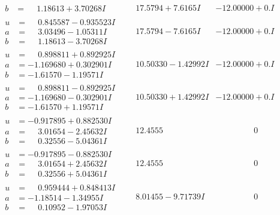 \documentclass[1p]{elsarticle_modified}
\theoremstyle{definition}
\begin{document}
$$\begin{array}{c|c|c}
\begin{aligned}
b &= \phantom{-}1.18613 + 3.70268 I\end{aligned}
 & \phantom{-}17.5794 + 7.6165 I & -12.00000 + 0. I\phantom{ +0.000000I} \\ \hline\begin{aligned}
u &= \phantom{-}0.845587 - 0.935523 I \\
a &= \phantom{-}3.03496 - 1.05311 I \\
b &= \phantom{-}1.18613 - 3.70268 I\end{aligned}
 & \phantom{-}17.5794 - 7.6165 I & -12.00000 + 0. I\phantom{ +0.000000I} \\ \hline\begin{aligned}
u &= \phantom{-}0.898811 + 0.892925 I \\
a &= -1.169680 + 0.302901 I \\
b &= -1.61570 - 1.19571 I\end{aligned}
 & \phantom{-}10.50330 - 1.42992 I & -12.00000 + 0. I\phantom{ +0.000000I} \\ \hline\begin{aligned}
u &= \phantom{-}0.898811 - 0.892925 I \\
a &= -1.169680 - 0.302901 I \\
b &= -1.61570 + 1.19571 I\end{aligned}
 & \phantom{-}10.50330 + 1.42992 I & -12.00000 + 0. I\phantom{ +0.000000I} \\ \hline\begin{aligned}
u &= -0.917895 + 0.882530 I \\
a &= \phantom{-}3.01654 - 2.45632 I \\
b &= \phantom{-}0.32556 - 5.04361 I\end{aligned}
 & \phantom{-}12.4555\phantom{ +0.000000I} & \phantom{-0.000000 } 0 \\ \hline\begin{aligned}
u &= -0.917895 - 0.882530 I \\
a &= \phantom{-}3.01654 + 2.45632 I \\
b &= \phantom{-}0.32556 + 5.04361 I\end{aligned}
 & \phantom{-}12.4555\phantom{ +0.000000I} & \phantom{-0.000000 } 0 \\ \hline\begin{aligned}
u &= \phantom{-}0.959444 + 0.848413 I \\
a &= -1.18514 - 1.34955 I \\
b &= \phantom{-}0.10952 - 1.97053 I\end{aligned}
 & \phantom{-}8.01455 - 9.71739 I & \phantom{-0.000000 } 0 \\ \hline\begin{aligned}

\end{aligned}
\end{array}$$
\end{document}
